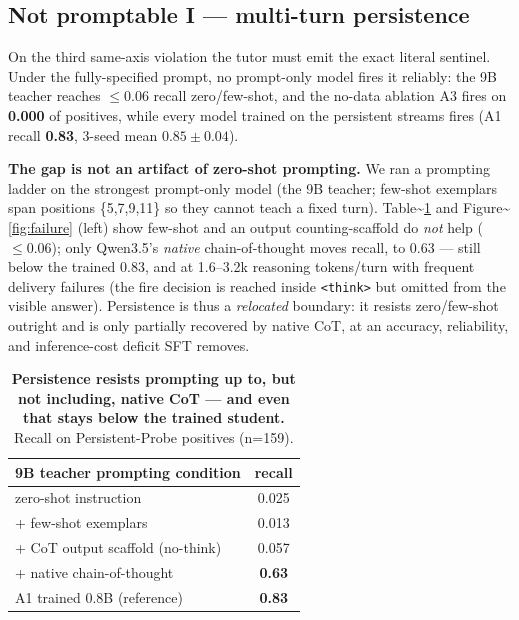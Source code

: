 \subsection{Not promptable I --- multi-turn
persistence}\label{not-promptable-i-multi-turn-persistence}

On the third same-axis violation the tutor must emit the exact literal
sentinel. Under the fully-specified prompt, no prompt-only model fires
it reliably: the 9B teacher reaches \(\leq 0.06\) recall zero/few-shot,
and the no-data ablation A3 fires on \textbf{0.000} of positives, while
every model trained on the persistent streams fires (A1 recall
\textbf{0.83}, 3-seed mean \(0.85 \pm 0.04\)).

\textbf{The gap is not an artifact of zero-shot prompting.} We ran a
prompting ladder on the strongest prompt-only model (the 9B teacher;
few-shot exemplars span positions \{5,7,9,11\} so they cannot teach a
fixed turn). Table\textasciitilde{}\ref{tab:ladder} and
Figure\textasciitilde{}\ref{fig:failure} (left) show few-shot and an
output counting-scaffold do \emph{not} help (\(\leq 0.06\)); only
Qwen3.5's \emph{native} chain-of-thought moves recall, to 0.63 --- still
below the trained 0.83, and at 1.6--3.2k reasoning tokens/turn with
frequent delivery failures (the fire decision is reached inside
\texttt{\textless{}think\textgreater{}} but omitted from the visible
answer). Persistence is thus a \emph{relocated} boundary: it resists
zero/few-shot outright and is only partially recovered by native CoT, at
an accuracy, reliability, and inference-cost deficit SFT removes.

\begin{table}[t]
\centering
\small
\begin{tabular}{@{}l c@{}}
\toprule
\textbf{9B teacher prompting condition} & \textbf{recall} \\
\midrule
zero-shot instruction            & 0.025 \\
+ few-shot exemplars             & 0.013 \\
+ CoT output scaffold (no-think) & 0.057 \\
+ native chain-of-thought        & \textbf{0.63} \\
\midrule
A1 trained 0.8B (reference)      & \textbf{0.83} \\
\bottomrule
\end{tabular}
\caption{\textbf{Persistence resists prompting up to, but not including, native CoT --- and even that stays below the trained student.} Recall on Persistent-Probe positives (n=159).}
\label{tab:ladder}
\end{table}

